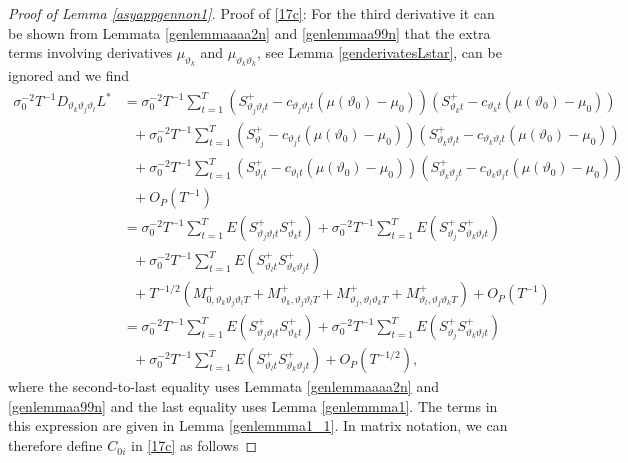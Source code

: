 {{\begin{proof}[Proof of Lemma \ref{asyappgennon1}]
Proof of \eqref{17c}: For the third derivative it can be shown from Lemmata \ref{genlemmaaaa2n} and \ref{genlemmaa99n} that the extra terms involving derivatives $\mu_{\vartheta_k}$ and $\mu_{\vartheta_k \vartheta_k}$, see Lemma \ref{genderivatesLstar}, can be ignored and we find
\begin{align*}
    \sigma_0^{-2} T^{-1} D_{\vartheta_k \vartheta_j \vartheta_l} L^*  &= \sigma_0^{-2} T^{-1}  \sum_{t = 1}^T \left( S_{\vartheta_j \vartheta_l t}^+ -  c_{\vartheta_j \vartheta_l t}\left(\mu(\vartheta_0)-\mu_0\right)\right) \left( S_{\vartheta_k t}^+ -  c_{\vartheta_k t}\left(\mu(\vartheta_0)-\mu_0\right)\right) \\
    & \ \ \ + \sigma_0^{-2} T^{-1} \sum_{t = 1}^T  \left(S_{\vartheta_j }^+ - c_{\vartheta_j t}\left(\mu(\vartheta_0)-\mu_0\right)\right) \left( S_{ \vartheta_k \vartheta_l t}^+ -  c_{\vartheta_k \vartheta_l t}\left(\mu(\vartheta_0)-\mu_0\right)\right) \\ 
     &\ \ \ + \sigma_0^{-2} T^{-1} \sum_{t = 1}^T  \left(S_{\vartheta_l t}^+ - c_{\vartheta_l t}\left(\mu(\vartheta_0)-\mu_0\right)\right) \left( S_{ \vartheta_k \vartheta_j t}^+ -  c_{\vartheta_k \vartheta_j t}\left(\mu(\vartheta_0)-\mu_0\right)\right)\\
     &\ \ \ + O_P(T^{-1}) \\ 
     &=  \sigma_0^{-2} T^{-1} \sum_{t = 1}^T E\left( S_{\vartheta_j \vartheta_l t}^+ S_{\vartheta_k t}^+ \right) +  \sigma_0^{-2} T^{-1} \sum_{t = 1}^T  E\left( S_{\vartheta_j }^+ S_{ \vartheta_k \vartheta_l t}^+ \right) \\ 
     &\ \ \ + \sigma_0^{-2} T^{-1} \sum_{t = 1}^T   E\left( S_{\vartheta_l t}^+ S_{ \vartheta_k \vartheta_j t}^+ \right) \\
     &\ \ \ + T^{-1/2} \left(  M^+_{0,\vartheta_k \vartheta_j \vartheta_l  T}  + M^+_{\vartheta_k ,\vartheta_{j}\vartheta_{l}   T} + M^+_{\vartheta_j ,\vartheta_{l}\vartheta_{k}   T} + M^+_{\vartheta_l ,\vartheta_{j}\vartheta_{k}   T} \right) + O_P(T^{-1}) \\
     &=  \sigma_0^{-2} T^{-1} \sum_{t = 1}^T E\left( S_{\vartheta_j \vartheta_l t}^+ S_{\vartheta_k t}^+ \right) +  \sigma_0^{-2} T^{-1} \sum_{t = 1}^T  E\left( S_{\vartheta_j }^+ S_{ \vartheta_k \vartheta_l t}^+ \right) \\ 
     &\ \ \ + \sigma_0^{-2} T^{-1} \sum_{t = 1}^T   E\left( S_{\vartheta_l t}^+ S_{ \vartheta_k \vartheta_j t}^+ \right) + O_P(T^{-1/2}),
\end{align*}
where the second-to-last equality uses Lemmata \ref{genlemmaaaa2n} and \ref{genlemmaa99n}  and the last equality uses Lemma \ref{genlemmma1}. The terms in this expression are given in Lemma \ref{genlemmma1_1}. In matrix notation, we can therefore  define $C_{0i}$ in \eqref{17c} as follows 

\end{proof}}}
